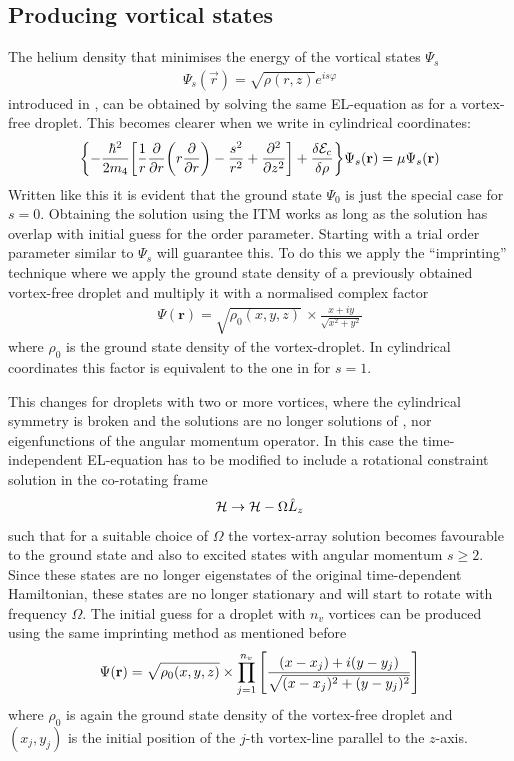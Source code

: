 		\subsection{Producing vortical states}\label{sec:vortical-states}
			The helium density that minimises the energy of the vortical states $\Psi_s$
			\begin{align}
				\Psi_s(\vec{r}) = \sqrt{\rho(r,z)}\unit{e}^{is\varphi}
			\end{align} 
			introduced in , can be obtained by solving the same EL-equation as for a vortex-free droplet. This becomes clearer when we write  in cylindrical coordinates:
			\begin{align}
				\qty{-\frac{\hbar^2}{2m_4}\qty[\frac{1}{r}\pdv{r}\qty(r\pdv{r})-\frac{s^2}{r^2}+\pdv[2]{z}]+\fdv{\mathcal{E}_c}{\rho}}\Psi_s(\vec{r}) = \mu\Psi_s(\vec{r}) \label{eq:el-cyl}
			\end{align}
			Written like this it is evident that the ground state $\Psi_0$ is just the special case for $s=0$. Obtaining the solution using the ITM works as long as the solution has overlap with initial guess for the order parameter. Starting with a trial order parameter similar to $\Psi_s$ will guarantee this. To do this we apply the ``imprinting'' technique where we apply the ground state density of a previously obtained vortex-free droplet and multiply it with a normalised complex factor
			\begin{align}
				\Psi(\mathbf{r}) = \sqrt{\rho_0(x,y,z)} \,\times \frac{x + iy}{\sqrt{x^2 + y^2}} \label{eq28}
			\end{align}
			where $\rho_0$ is the ground state density of the vortex-droplet.  In cylindrical coordinates this factor is equivalent to the one in  for $s=1$. 
			
			This changes for droplets with two or more vortices, where the cylindrical symmetry is broken and the solutions are no longer solutions of , nor eigenfunctions of the angular momentum operator. In this case the time-independent EL-equation has to be modified to include a rotational constraint solution in the co-rotating frame
			\begin{align}
				{\cal H} \rightarrow {\cal H}-\Omega \hat{L}_z
			\end{align}
			 such that for a suitable choice of $\Omega$ the vortex-array solution becomes favourable to the ground state and also to excited states with angular momentum $s\geq 2$. Since these states are no longer eigenstates of the original time-dependent Hamiltonian, these states are no longer stationary and will start to rotate with frequency $\Omega$. The initial guess for a droplet with $n_v$ vortices can be produced using the same imprinting method as mentioned before		
			\begin{align}
				\Psi(\mathbf{r})=\sqrt{\rho_0(x,y,z)} \times \prod _{j=1}^{n_v}\left[ {(x-x_j)+i(y-y_j) \over \sqrt{(x-x_j)^2+(y-y_j)^2}}  \right] \label{eq32}
			\end{align}
			where $\rho_0$ is again the ground state density of the vortex-free droplet and $(x_j,y_j)$ is the initial position of the $j$-th vortex-line parallel to the $z$-axis.
	
